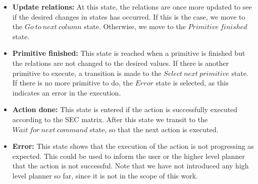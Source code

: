 \begin{itemize}
 \item \textbf{Update relations:} At this state, the relations are once more updated to see if the desired changes in states has occurred.
 If this is the case, we move to the $Go\ to\ next\ column$ state.
 Otherwise, we move to the $Primitive\ finished$ state.
 \item \textbf{Primitive finished:} This state is reached when a primitive is finished but the relations are not changed to the desired values.
 If there is another primitive to execute, a transition is made to the $Select\ next\ primitive$ state.
 If there is no more primitive to do, the $Error$ state is selected, as this indicates an error in the execution.
 \item \textbf{Action done:} This state is entered if the action is successfully executed according to the SEC matrix.
 After this state we transit to the $Wait\ for\ next\ command$ state, so that the next action is executed.
 \item \textbf{Error:} This state shows that the execution of the action is not progressing as expected.
 This could be used to inform the user or the higher level planner that the action is not successful. Note that we have not introduced any high level planner so far, since it is not in the scope of this work.
\end{itemize}


